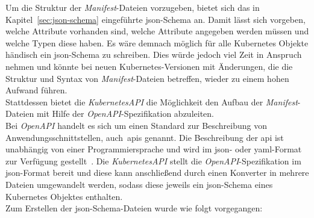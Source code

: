Um die Struktur der \textit{Manifest}-Dateien vorzugeben, bietet sich das in Kapitel~\ref{sec:json-schema} eingeführte \acs{json}-Schema an.
Damit lässt sich vorgeben, welche Attribute vorhanden sind, welche Attribute angegeben werden müssen und welche Typen diese haben.
Es wäre demnach möglich für alle Kubernetes Objekte händisch ein \acs{json}-Schema zu schreiben. Dies würde jedoch viel Zeit in Anspruch nehmen und
könnte bei neuen Kubernetes-Versionen mit Änderungen, die die Struktur und Syntax von \textit{Manifest}-Dateien betreffen, wieder zu einem hohen Aufwand führen.
\\
Stattdessen bietet die \textit{KubernetesAPI} die Möglichkeit den Aufbau der \textit{Manifest}-Dateien mit Hilfe der \textit{OpenAPI}-Spezifikation abzuleiten.
\\
Bei \textit{OpenAPI} handelt es sich um einen Standard zur Beschreibung von Anwendungsschnittstellen, auch~\ac{api}s genannt. Die Beschreibung der \acs{api} ist
unabhängig von einer Programmiersprache und wird im \ac{json}- oder \ac{yaml}-Format zur Verfügung gestellt~\cite{openapi-org}.
Die \textit{KubernetesAPI} stellt die \textit{OpenAPI}-Spezifikation im \ac{json}-Format bereit und diese kann anschließend durch einen Konverter in
mehrere Dateien umgewandelt werden, sodass diese jeweils ein \acs{json}-Schema eines Kubernetes Objektes enthalten.
\\
Zum Erstellen der \acs{json}-Schema-Dateien wurde wie folgt vorgegangen:


